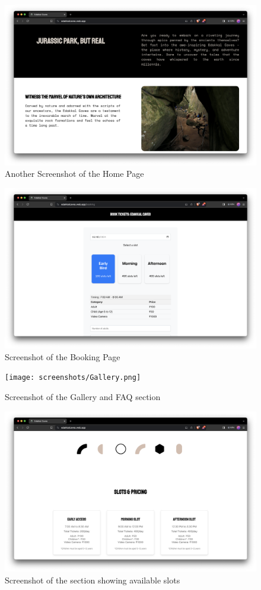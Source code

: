 \documentclass[12pt,a4paper]{report}
\begin{document}
\begin{figure}[htbp]
    \centering
    \includegraphics[width=1\textwidth]{screenshots/Home-2.png}
    \caption{Another Screenshot of the Home Page}
\end{figure}

\begin{figure}[htbp]
    \centering
    \includegraphics[width=1\textwidth]{screenshots/Booking.png}
    \caption{Screenshot of the Booking Page}
\end{figure}

\begin{figure}[htbp]
    \centering
    \texttt{[image: screenshots/Gallery.png]}
    \caption{Screenshot of the Gallery and FAQ section}
\end{figure}


\begin{figure}[htbp]
    \centering
    \includegraphics[width=1\textwidth]{screenshots/Slots.png}
    \caption{Screenshot of the section showing available slots}
\end{figure}
\end{document}
